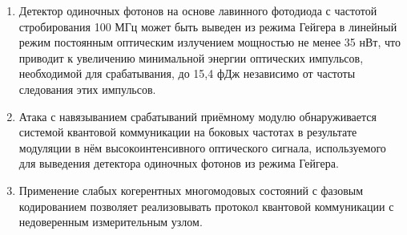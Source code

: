 {}
\begin{enumerate}

  \item Детектор одиночных фотонов на основе лавинного фотодиода с частотой стробирования 100 МГц  может быть выведен из режима Гейгера в линейный режим постоянным оптическим излучением мощностью не менее 35 нВт, что приводит к увеличению минимальной энергии оптических импульсов, необходимой для срабатывания, до 15,4 фДж независимо от частоты следования этих импульсов.
  
  \item Атака с навязыванием срабатываний приёмному модулю обнаруживается системой квантовой коммуникации на боковых частотах в результате модуляции в нём высокоинтенсивного оптического сигнала, используемого для выведения детектора одиночных фотонов из режима Гейгера. 				 
  \item Применение слабых когерентных многомодовых состояний с фазовым кодированием позволяет реализовывать протокол квантовой коммуникации с недоверенным измерительным узлом.
  
 
  
  

\end{enumerate}
